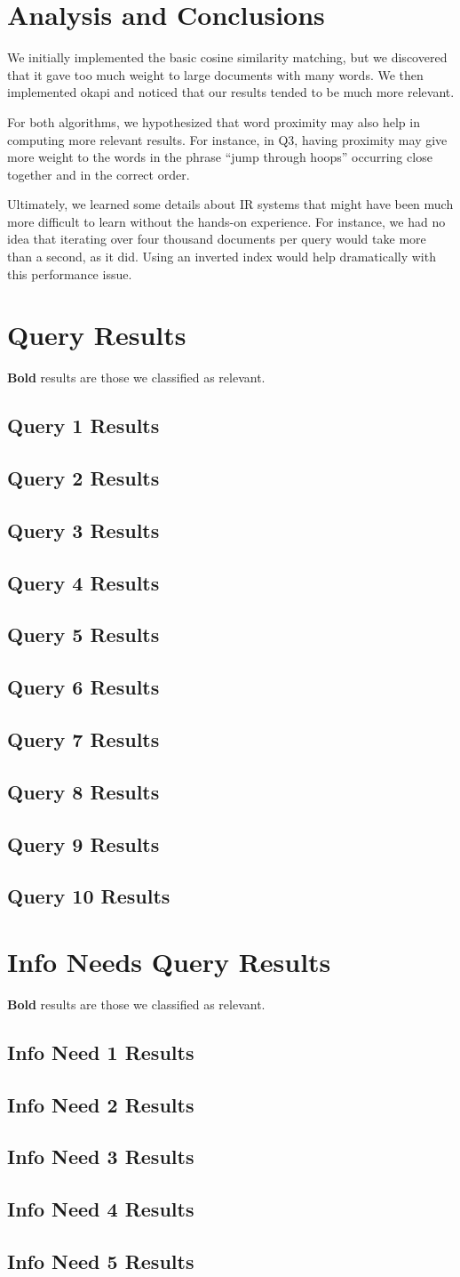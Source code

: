 \documentclass[draft]{report}
\newcommand{\results}[2]{\subsection{Query #1 Results}\begin{list}{}{}\end{list}}
\newcommand{\needresults}[2]{\subsection{Info Need #1 Results}\begin{list}{}{}\end{list}}
\newcommand{\okapi}{okapi }
\newcommand{\cosine}{cosine similarity }
\begin{document}
\section{Analysis and Conclusions}
We initially implemented the basic \cosine matching, but we discovered
that it gave too much weight to large documents with many words. We
then implemented \okapi and noticed that our results tended to be much
more relevant.

For both algorithms, we hypothesized that word proximity may also help
in computing more relevant results. For instance, in Q3, having
proximity may give more weight to the words in the phrase ``jump
through hoops'' occurring close together and in the correct order.

Ultimately, we learned some details about IR systems that might have
been much more difficult to learn without the hands-on experience. For
instance, we had no idea that iterating over four thousand documents
per query would take more than a second, as it did. Using an inverted
index would help dramatically with this performance issue.

\appendix
\section{Query Results}
\textbf{Bold} results are those we classified as relevant.
\label{query-responses}
\results{1}{queryresults01.txt.tex}
\results{2}{queryresults02.txt.tex}
\results{3}{queryresults03.txt.tex}
\results{4}{queryresults04.txt.tex}
\results{5}{queryresults05.txt.tex}
\results{6}{queryresults06.txt.tex}
\results{7}{queryresults07.txt.tex}
\results{8}{queryresults08.txt.tex}
\results{9}{queryresults09.txt.tex}
\results{10}{queryresults10.txt.tex}
\section{Info Needs Query Results}
\label{need-responses}
\textbf{Bold} results are those we classified as relevant.
\needresults{1}{InfoNeed01.txt.tex}
\needresults{2}{InfoNeed02.txt.tex}
\needresults{3}{InfoNeed03.txt.tex}
\needresults{4}{InfoNeed04.txt.tex}
\needresults{5}{InfoNeed05.txt.tex}
\end{document}
